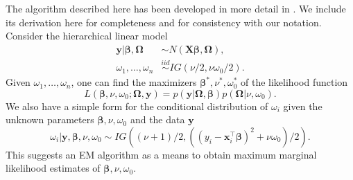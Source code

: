\documentclass[12pt]{article}
\newcommand{\bl}[1]{{\mathbf #1}}
\newcommand{\bs}[1]{\boldsymbol #1}
\begin{document}
The algorithm described here has been developed in more detail in \cite{liu_ml_1995}. We include its derivation here for completeness and for consistency with our notation. Consider the hierarchical linear model
\begin{equation*}
    \begin{aligned}
    \bl{y} | \bs{\beta}, \bs{\Omega} &\sim N(\bl{X} \bs{\beta}, \bs{\Omega}),\\
    \omega_1, \dots, \omega_n &\overset{iid}{\sim} IG(\nu/2, \nu \omega_0 / 2).
    \end{aligned} 
\end{equation*}
Given $\omega_1, \dots, \omega_n$, one can find the maximizers $\bs{\beta}^*, \nu^*, \omega_0^{*}$ of the likelihood function
\begin{equation}\label{eq:jlik}
    L(\bs{\beta}, \nu, \omega_0; \bs{\Omega}, \bl{y}) = p(\bl{y} | \bs{\Omega}, \bs{\beta}) p(\bs{\Omega} | \nu, \omega_0).
\end{equation}
We also have a simple form for the conditional distribution of $\omega_i$ given the unknown parameters $\bs{\beta}, \nu, \omega_0$ and the data $\bl{y}$
\begin{equation}\label{eq:conddist}
    \omega_i | \bl{y}, \bs{\beta}, \nu, \omega_0 \sim IG((\nu+1)/2, ((y_i - \bl{x}_i^\top \bs{\beta})^2 + \nu \omega_0)/2).
\end{equation}
This suggests an EM algorithm as a means to obtain maximum marginal likelihood estimates of $\bs{\beta}, \nu, \omega_0$.
\end{document}
